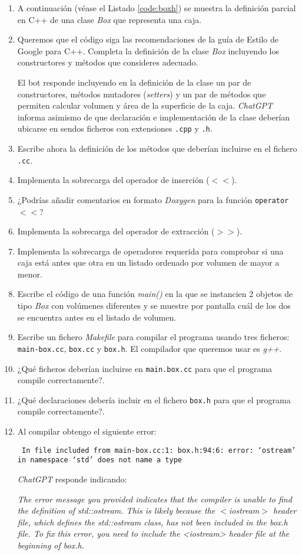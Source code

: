\documentclass[twocolumn,twoside,a4paper, 10pt]{article}
\newcommand{\ChatGPT}{\textit{ChatGPT}{}}           %
\begin{document}
\begin{enumerate}
  \item A continuación (véase el Listado \ref{code:boxh}) se muestra la definición parcial en C++ de una clase \textit{Box}
    que representa una caja.
  \item Queremos que el código siga las recomendaciones de la guía de Estilo de Google para C++.
        Completa la definición de la clase \textit{Box} incluyendo los constructores y métodos que consideres
        adecuado.

        El bot responde incluyendo en la definición de la clase un par de constructores, métodos mutadores 
        (\textit{setters}) y un par de métodos que permiten calcular volumen y área de la superficie de la caja.
        \ChatGPT{} informa asimismo de que declaración e implementación de la clase deberían ubicarse en sendos ficheros
        con extensiones \texttt{.cpp} y \texttt{.h}. 
  \item Escribe ahora la definición de los métodos que deberían incluirse en el fichero \texttt{.cc}.
  \item Implementa la sobrecarga del operador de inserción (\texttt{$<<$}).
  \item ¿Podrías añadir comentarios en formato \textit{Doxygen} para la función \texttt{operator$<<$}?
  \item Implementa la sobrecarga del operador de extracción (\texttt{$>>$}).
  \item Implementa la sobrecarga de operadores requerida para comprobar si una caja está antes que otra 
        en un listado ordenado por volumen de mayor a menor.
  \item Escribe el código de una función \textit{main()} en la que se instancien 2 objetos de tipo \textit{Box} 
        con volúmenes diferentes y se muestre por pantalla cuál de los dos se encuentra antes en el listado de volumen.
  \item Escribe un fichero \textit{Makefile} para compilar el programa usando tres ficheros:
    \texttt{main-box.cc}, \texttt{box.cc} y \texttt{box.h}.
        El compilador que queremos usar es \textit{g++}.
  \item ¿Qué ficheros deberían incluirse en \texttt{main.box.cc} para que el programa compile correctamente?.
  \item ¿Qué declaraciones debería incluir en el fichero \texttt{box.h} para que el programa compile
    correctamente?.
  \item Al compilar obtengo el siguiente error:

        \texttt{
In file included from main-box.cc:1:
box.h:94:6: error: ‘ostream’ in namespace ‘std’ does not name a type
        }

        \ChatGPT{} responde indicando:

        \textit{
        The error message you provided indicates that the compiler is unable to find the definition of std::ostream. 
        This is likely because the $<$iostream$>$ header file, which defines the std::ostream class, has not been included in the box.h file.
        To fix this error, you need to include the <iostream> header file at the beginning of box.h. 
        }
\end{enumerate}
\end{document}
